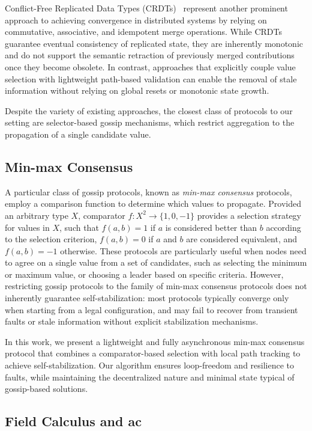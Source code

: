 \documentclass[runningheads]{llncs}
\begin{document}
Conflict-Free Replicated Data Types (CRDTs)~\cite{DBLP:journals/corr/abs-0907-0929}
represent another prominent approach to achieving convergence in distributed systems by relying on commutative,
associative, and idempotent merge operations.
%
While CRDTs guarantee eventual consistency of replicated state,
they are inherently monotonic and do not support the semantic retraction of previously merged contributions once they become obsolete.
%
In contrast,
approaches that explicitly couple value selection with lightweight path-based validation
can enable the removal of stale information
without relying on global resets or monotonic state growth.


Despite the variety of existing approaches,
the closest class of protocols to our setting are selector-based gossip mechanisms,
which restrict aggregation to the propagation of a single candidate value.

\subsection{Min-max Consensus}\label{subsec:gossip-select}
A particular class of gossip protocols,
known as \emph{min-max consensus} protocols,
employ a comparison function to determine which values to propagate.
%
Provided an arbitrary type $X$,
comparator $f: X^2 \to \{1, 0, -1\}$
provides a selection strategy for values in $X$,
such that $f(a,b) = 1$ if $a$ is considered better than $b$ according to the selection criterion,
$f(a,b) = 0$ if $a$ and $b$ are considered equivalent,
and $f(a,b) = -1$ otherwise.
%
These protocols are particularly useful when nodes need to agree on a single value from a set of candidates,
such as selecting the minimum or maximum value, or choosing a leader based on specific criteria.
%
However, restricting gossip protocols to the family of min-max consensus protocols
does not inherently guarantee self-stabilization:
most protocols typically converge only when starting from a legal configuration,
and may fail to recover from transient faults or stale information without explicit stabilization mechanisms.

In this work,
we present a lightweight and fully asynchronous min-max consensus protocol
that combines a comparator-based selection with local path tracking to achieve self-stabilization.
%
Our algorithm ensures loop-freedom and resilience to faults,
while maintaining the decentralized nature and minimal state typical of gossip-based solutions.

\subsection{Field Calculus and \acl{ac}}
\label{subsec:field-calculus-and-aggregate-computing}
\end{document}
